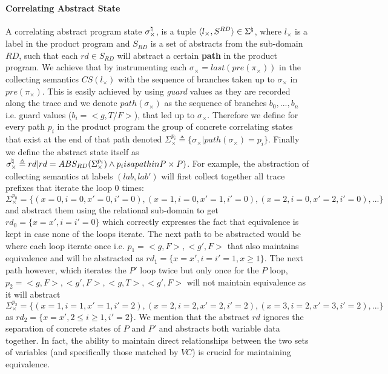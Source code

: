 \paragraph{Correlating Abstract State} 
A correlating abstract program state $\sigma_{\times}^\natural$, is a tuple $\langle l_{\times}, S^{RD} \rangle \in \Sigma^\natural$, where $l_{\times}$ is a label in the product program and $S_{RD}$ is a set of abstracts from the sub-domain $RD$, such that each $rd \in S_{RD}$ will abstract a certain \textbf{path} in the product program. We achieve that by instrumenting each $\sigma_{\times} = last(pre(\pi_{\times}))$ in the collecting semantics $CS(l_{\times})$ with the sequence of branches taken up to $\sigma_{\times}$ in $pre(\pi_{\times})$. This is easily achieved by using \emph{guard} values as they are recorded along the trace and we denote $path(\sigma_{\times})$ as the sequence of branches $b_0,...,b_n$ i.e. guard values ($b_i = <g,{T/F}>$), that led up to $\sigma_{\times}$. Therefore we define for every path $p_i$ in the product program the group of concrete correlating states that exist at the end of that path denoted $\Sigma_{\times}^{p_i} \triangleq \{ \sigma_{\times} | path(\sigma_{\times}) = p_i \}$. Finally we define the abstract state itself as $\sigma_{\times}^\natural \triangleq { rd | rd = ABS_{RD}(\Sigma_{\times}^{p_i}) \wedge p_i is a path in P \times P)}$. For example, the abstraction of \figref{} collecting semantics at labels $(lab,lab')$ will first collect together all trace prefixes that iterate the loop 0 times: $\Sigma_{\times}^{p_0} = \{  (x=0,i=0,x'=0,i'=0), (x=1,i=0,x'=1,i'=0), (x=2,i=0,x'=2,i'=0), ... \}$ and abstract them using the relational sub-domain to get $rd_{0} = \{x=x',i=i'=0\}$ which correctly expresses the fact that equivalence is kept in case none of the loops iterate. The next path to be abstracted would be where each loop iterate once i.e. $p_1 = <g,F>,<g',F>$ that also maintains equivalence and will be abstracted as $rd_{1} = \{x=x',i=i'=1, x \geq 1\}$. The next path however, which iterates the $P'$ loop twice but only once for the $P$ loop, $p_2 = <g,F>,<g',F>,<g,T>,<g',F>$ will not maintain equivalence as it will abstract $\Sigma_{\times}^{p_2} = \{  (x=1,i=1,x'=1,i'=2), (x=2,i=2,x'=2,i'=2), (x=3,i=2,x'=3,i'=2), ... \}$ as $rd_{2} = \{x=x',2 \leq i \geq 1, i'=2\}$. We mention that the abstract $rd$ ignores the separation of concrete states of $P$ and $P'$ and abstracts both variable data together. In fact, the ability to maintain direct relationships between the two sets of variables (and specifically those matched by $VC$) is crucial for maintaining equivalence.
 
